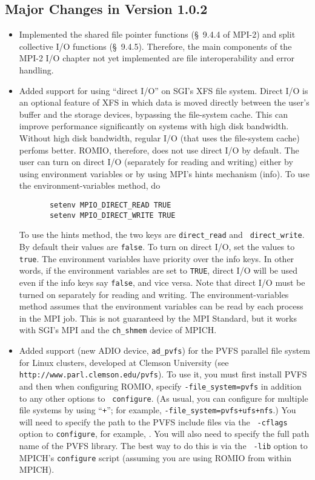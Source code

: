 \subsection{Major Changes in Version 1.0.2}
\begin{itemize}
\item Implemented the shared file pointer functions (\S~9.4.4 of MPI-2) and 
  split collective I/O functions (\S~9.4.5). Therefore, the main
   components of the MPI-2 I/O chapter not yet implemented are 
  file interoperability and error handling.

\item Added support for using ``direct I/O'' on SGI's XFS file system. 
  Direct I/O is an optional feature of XFS in which data is moved
  directly between the user's buffer and the storage devices, bypassing 
  the file-system cache. This can improve performance significantly on 
  systems with high disk bandwidth. Without high disk bandwidth,
  regular I/O (that uses the file-system cache) perfoms better.
  ROMIO, therefore, does not use direct I/O by default. The user can
  turn on direct I/O (separately for reading and writing) either by
  using environment variables or by using MPI's hints mechanism (info). 
  To use the environment-variables method, do
\begin{verbatim}
       setenv MPIO_DIRECT_READ TRUE
       setenv MPIO_DIRECT_WRITE TRUE
\end{verbatim}
  To use the hints method, the two keys are {\tt direct\_read} and {\tt
  direct\_write}.  By default their values are {\tt false}. To turn on
  direct I/O, set the values to {\tt true}. The environment variables
  have priority over the info keys.  In other words, if the environment
  variables are set to {\tt TRUE}, direct I/O will be used even if the
  info keys say {\tt false}, and vice versa.  Note that direct I/O must be
  turned on separately for reading and writing.  The environment-variables
  method assumes that the environment variables can be read by each
  process in the MPI job. This is not guaranteed by the MPI Standard,
  but it works with SGI's MPI and the {\tt ch\_shmem} device of MPICH.

\item Added support (new ADIO device, {\tt ad\_pvfs}) for the PVFS parallel 
  file system for Linux clusters, developed at Clemson University
  (see {\tt http://www.parl.clemson.edu/pvfs}). To use it, you
  must first install PVFS and then when configuring ROMIO, specify
  {\tt -file\_system=pvfs} in addition to any other options to {\tt
  configure}. (As usual, you can configure for multiple file systems by
  using ``{\tt +}''; for example, {\tt -file\_system=pvfs+ufs+nfs}.) You
  will need to specify the path to the PVFS include files via the {\tt
  -cflags} option to {\tt configure}, for example, . You will also need to specify the full
  path name of the PVFS library. The best way to do this is via the {\tt
  -lib} option to MPICH's {\tt configure} script (assuming you are using
  ROMIO from within MPICH).


\end{itemize}
